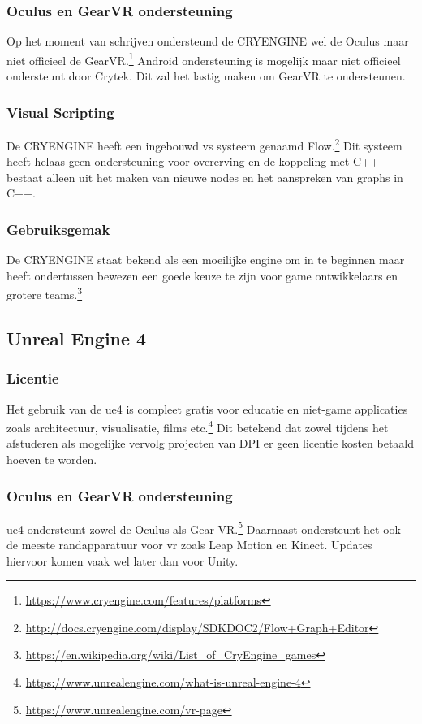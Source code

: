 \subsubsection{Oculus en GearVR ondersteuning}
Op het moment van schrijven ondersteund de CRYENGINE wel de Oculus maar niet officieel de GearVR.\footnote{\url{https://www.cryengine.com/features/platforms}} Android ondersteuning is mogelijk maar niet officieel ondersteunt door Crytek. Dit zal het lastig maken om GearVR te ondersteunen.

\subsubsection{Visual Scripting}
De CRYENGINE heeft een ingebouwd \gls{vs} systeem genaamd Flow.\footnote{\url{http://docs.cryengine.com/display/SDKDOC2/Flow+Graph+Editor}} Dit systeem heeft helaas geen ondersteuning voor overerving en de koppeling met C++ bestaat alleen uit het maken van nieuwe nodes en het aanspreken van graphs in C++.

\subsubsection{Gebruiksgemak}
De CRYENGINE staat bekend als een moeilijke engine om in te beginnen maar heeft ondertussen bewezen een goede keuze te zijn voor game ontwikkelaars en grotere teams.\footnote{\url{https://en.wikipedia.org/wiki/List_of_CryEngine_games}}

\subsection{Unreal Engine 4}
\subsubsection{Licentie}
Het gebruik van de \gls{ue4} is compleet gratis voor educatie en niet-game applicaties zoals architectuur, visualisatie, films etc.\footnote{\url{https://www.unrealengine.com/what-is-unreal-engine-4}} Dit betekend dat zowel tijdens het afstuderen als mogelijke vervolg projecten van DPI er geen licentie kosten betaald hoeven te worden.

\subsubsection{Oculus en GearVR ondersteuning}
\gls{ue4} ondersteunt zowel de Oculus als Gear VR.\footnote{\url{https://www.unrealengine.com/vr-page}} Daarnaast ondersteunt het ook de meeste randapparatuur voor \gls{vr} zoals Leap Motion en Kinect. Updates hiervoor komen vaak wel later dan voor Unity.

